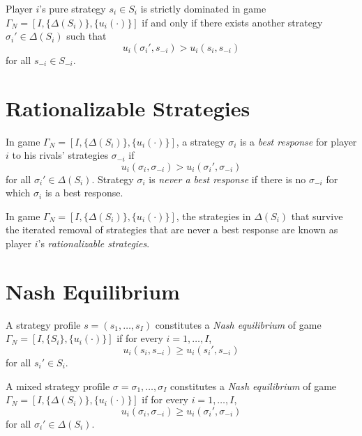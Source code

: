 \begin{prop}
    Player $i$'s pure strategy $s_i \in S_i$ is strictly dominated in game $\Gamma_N = [I, \{\Delta(S_i)\}, \{u_i(\cdot)\}]$ if and only if there exists another strategy $\sigma_i' \in \Delta(S_i)$ such that 
    \begin{equation*}
        u_i (\sigma_i', s_{-i}) > u_i (s_i, s_{-i})
    \end{equation*}
    for all $s_{-i} \in S_{-i}$.
\end{prop}


\section{Rationalizable Strategies}

\begin{defn}
    In game $\Gamma_N = [I, \{\Delta(S_i)\}, \{u_i(\cdot)\}]$, a strategy $\sigma_i$ is a \emph{best response} for player $i$ to his rivals' strategies $\sigma_{-i}$ if
    \begin{equation*}
        u_i (\sigma_i, \sigma_{-i}) > u_i (\sigma_i', \sigma_{-i})
    \end{equation*}
    for all $\sigma_i' \in \Delta(S_i)$. Strategy $\sigma_i$ is \emph{never a best response} if there is no $\sigma_{-i}$ for which $\sigma_i$ is a best response.
\end{defn}

\begin{defn}
    In game $\Gamma_N = [I, \{\Delta(S_i)\}, \{u_i(\cdot)\}]$, the strategies in $\Delta(S_i)$ that survive the iterated removal of strategies that are never a best response are known as player $i$'s \emph{rationalizable strategies}.
\end{defn}


\section{Nash Equilibrium}

\begin{defn}
    A strategy profile $s = (s_1, \dots, s_I)$ constitutes a \emph{Nash equilibrium} of game $\Gamma_N = [I, \{S_i\}, \{u_i(\cdot)\}]$ if for every $i = 1, \dots, I$,
    \begin{equation*}
        u_i (s_i, s_{-i}) \geq u_i (s_i', s_{-i})
    \end{equation*}
    for all $s_i' \in S_i$.
\end{defn}

\begin{defn}
    A mixed strategy profile $\sigma = \sigma_1, \dots, \sigma_I$ constitutes a \emph{Nash equilibrium} of game $\Gamma_N = [I, \{\Delta(S_i)\}, \{u_i(\cdot)\}]$ if for every $i = 1, \dots, I$,
    \begin{equation*}
        u_i (\sigma_i, \sigma_{-i}) \geq u_i (\sigma_i', \sigma_{-i})
    \end{equation*}
    for all $\sigma_i' \in \Delta(S_i)$.
\end{defn}

